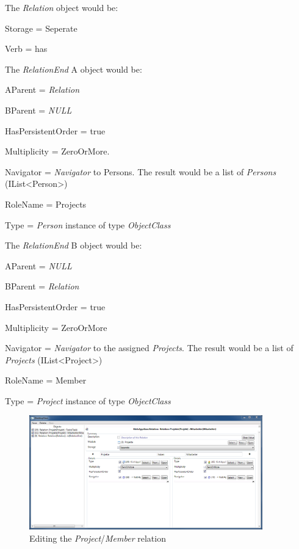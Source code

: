 The \emph{Relation} object would be:
\begin{descriptionBorder}
	\item[Storage] 		{ = Seperate }
	\item[Verb] 		{ = has }
\end{descriptionBorder}

The \emph{RelationEnd} A object would be:
\begin{descriptionBorder}
	\item[AParent] { = \emph{Relation}  }
	\item[BParent] { = \emph{NULL} }
	\item[HasPersistentOrder] { = true  }
	\item[Multiplicity] { = ZeroOrMore. }
	\item[Navigator] { = \emph{Navigator} to Persons. The result would be a list of \emph{Persons} (IList\textless Person\textgreater) }
	\item[RoleName] { = Projects }
	\item[Type] { = \emph{Person} instance of type \emph{ObjectClass} }
\end{descriptionBorder}

The \emph{RelationEnd} B object would be:
\begin{descriptionBorder}
	\item[AParent] { =  \emph{NULL} }
	\item[BParent] { = \emph{Relation} }
	\item[HasPersistentOrder] { = true  }
	\item[Multiplicity] { = ZeroOrMore }
	\item[Navigator] { = \emph{Navigator} to the assigned \emph{Projects}. The result would be a list of \emph{Projects} (IList\textless Project\textgreater)  }
	\item[RoleName] { = Member }
	\item[Type] { = \emph{Project} instance of type \emph{ObjectClass} }
\end{descriptionBorder}

\begin{figure}[ht]
	\begin{center}
		\includegraphics[width=0.9\textwidth]{images/ScreenShot_Rel_Project_ProjectMember.png}
		\caption{Editing the \emph{Project}/\emph{Member} relation}
		\label{editing_project_member_relation}
	\end{center}
\end{figure}

